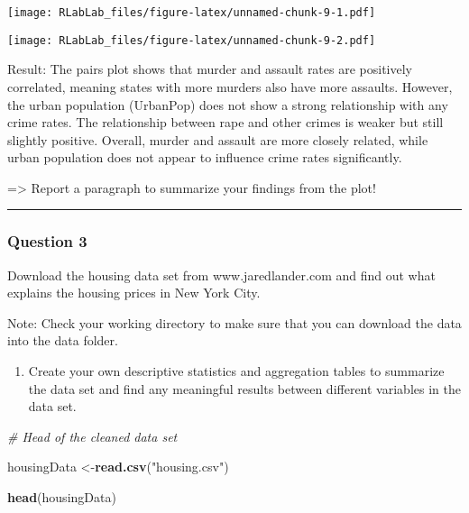\documentclass[
]{article}
\newenvironment{Shaded}{\begin{snugshade}}{\end{snugshade}}
\newcommand{\AttributeTok}[1]{\textcolor[rgb]{0.13,0.29,0.53}{#1}}
\newcommand{\CommentTok}[1]{\textcolor[rgb]{0.56,0.35,0.01}{\textit{#1}}}
\newcommand{\FunctionTok}[1]{\textcolor[rgb]{0.13,0.29,0.53}{\textbf{#1}}}
\newcommand{\NormalTok}[1]{#1}
\newcommand{\OtherTok}[1]{\textcolor[rgb]{0.56,0.35,0.01}{#1}}
\newcommand{\SpecialCharTok}[1]{\textcolor[rgb]{0.81,0.36,0.00}{\textbf{#1}}}
\newcommand{\StringTok}[1]{\textcolor[rgb]{0.31,0.60,0.02}{#1}}
\providecommand{\tightlist}{%
  \setlength{\itemsep}{0pt}\setlength{\parskip}{0pt}}
\begin{document}
\texttt{[image: RLabLab\_files/figure-latex/unnamed-chunk-9-1.pdf]}

\begin{Shaded}
\end{Shaded}

\texttt{[image: RLabLab\_files/figure-latex/unnamed-chunk-9-2.pdf]}

Result: The pairs plot shows that murder and assault rates are
positively correlated, meaning states with more murders also have more
assaults. However, the urban population (UrbanPop) does not show a
strong relationship with any crime rates. The relationship between rape
and other crimes is weaker but still slightly positive. Overall, murder
and assault are more closely related, while urban population does not
appear to influence crime rates significantly.

=\textgreater{} Report a paragraph to summarize your findings from the
plot!

\begin{center}\rule{0.5\linewidth}{0.5pt}\end{center}

\subsubsection{Question 3}\label{question-3}

Download the housing data set from www.jaredlander.com and find out what
explains the housing prices in New York City.

Note: Check your working directory to make sure that you can download
the data into the data folder.

\begin{enumerate}
\def\labelenumi{\alph{enumi}.}
\tightlist
\item
  Create your own descriptive statistics and aggregation tables to
  summarize the data set and find any meaningful results between
  different variables in the data set.
\end{enumerate}

\begin{Shaded}
\begin{Highlighting}[]
\CommentTok{\# Head of the cleaned data set}

\NormalTok{housingData }\OtherTok{\textless{}{-}}\FunctionTok{read.csv}\NormalTok{(}\StringTok{"housing.csv"}\NormalTok{)}

\FunctionTok{head}\NormalTok{(housingData)}
\end{Highlighting}
\end{Shaded}
\end{document}
